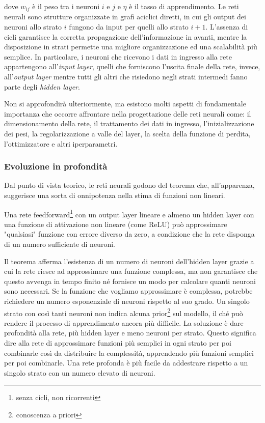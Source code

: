 dove \(w_{ij}\) è il peso tra i neuroni \(i\) e \(j\) e \(\eta\) è il tasso di apprendimento. Le reti neurali sono strutture organizzate in grafi aciclici diretti, in cui gli output dei neuroni allo strato $i$ fungono da input per quelli allo strato $i+1$. L'assenza di cicli garantisce la corretta propagazione dell’informazione in avanti, mentre la disposizione in strati permette una migliore organizzazione ed una scalabilità più semplice. In particolare, i neuroni che ricevono i dati in ingresso alla rete appartengono all'\textit{input layer}, quelli che forniscono l'uscita finale della rete, invece, all'\textit{output layer} mentre tutti gli altri che risiedono negli strati intermedi fanno parte degli \textit{hidden layer}. 

Non si approfondirà ulteriormente, ma esistono molti aspetti di fondamentale importanza che occorre affrontare nella progettazione delle reti neurali come: il dimensionamento della rete, il trattamento dei dati in ingresso, l'inizializzazione dei pesi, la regolarizzazione a valle del layer, la scelta della funzione di perdita, l'ottimizzatore e altri iperparametri.


\subsubsection{Evoluzione in profondità}
Dal punto di vista teorico, le reti neurali godono del teorema che, all'apparenza, suggerisce una sorta di onnipotenza nella stima di funzioni non lineari.

\begin{theorem}
    Una rete feedforward\footnote{senza cicli, non ricorrenti} con un output layer lineare e almeno un hidden layer con una funzione di attivazione non lineare (come ReLU) può approssimare "qualsiasi" funzione con errore diverso da zero, a condizione che la rete disponga di un numero sufficiente di neuroni.
\end{theorem}

Il teorema afferma l'esistenza di un numero di neuroni dell'hidden layer grazie a cui la rete riesce ad approssimare una funzione complessa, ma non garantisce che questo avvenga in tempo finito né fornisce un modo per calcolare quanti neuroni sono necessari. Se la funzione che vogliamo approssimare è complessa, potrebbe richiedere un numero esponenziale di neuroni rispetto al suo grado. Un singolo strato con così tanti neuroni non indica alcuna prior\footnote{conoscenza a priori} sul modello, il ché può rendere il processo di apprendimento ancora più difficile. La soluzione è dare profondità alla rete, più hidden layer e meno neuroni per strato. Questo significa dire alla rete di approssimare funzioni più semplici in ogni strato per poi combinarle così da distribuire la complessità, apprendendo più funzioni semplici per poi combinarle. Una rete profonda è più facile da addestrare rispetto a un singolo strato con un numero elevato di neuroni.

